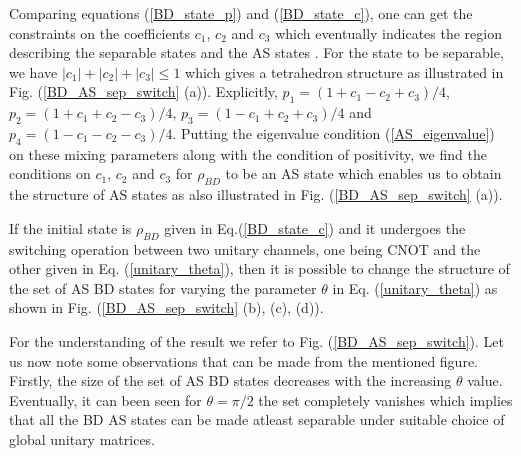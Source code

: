 \noindent Comparing equations (\ref{BD_state_p}) and (\ref{BD_state_c}), one can get the constraints on the coefficients $c_1$, $c_2$ and $c_3$ which eventually indicates the region describing the separable states and the AS states \cite{LC_10}. For the state to be separable, we have $|c_1|+|c_2|+|c_3| \leq 1$ which gives a tetrahedron structure as illustrated in Fig. (\ref{BD_AS_sep_switch} (a)). Explicitly, $p_1=(1+c_1-c_2+c_3)/4$, $p_2=(1+c_1+c_2-c_3)/4$, $p_3=(1-c_1+c_2+c_3)/4$ and $p_4=(1-c_1-c_2-c_3)/4$. Putting the eigenvalue condition (\ref{AS_eigenvalue}) on these mixing parameters along with the condition of positivity, we find the conditions on $c_1$, $c_2$ and $c_3$ for $\rho_{BD}$ to be an AS state which enables us to obtain the structure of AS states as also illustrated in Fig. (\ref{BD_AS_sep_switch} (a)). 
\begin{result}
    If the initial state is $\rho_{BD}$ given in Eq.(\ref{BD_state_c}) and it undergoes the switching operation between two unitary channels, one being CNOT and the other given in Eq. (\ref{unitary_theta}), then it is possible to change the structure of the set of AS BD states for varying the parameter $\theta$ in Eq. (\ref{unitary_theta}) as shown in Fig. (\ref{BD_AS_sep_switch} (b), (c), (d)). 
\end{result}
For the understanding of the result we refer to Fig. (\ref{BD_AS_sep_switch}). Let us now note some observations that can be made from the mentioned figure. Firstly, the size of the set of AS BD states decreases with the increasing $\theta$ value. Eventually, it can been seen for $\theta=\pi/2$ the set completely vanishes which implies that all the BD AS states can be made atleast separable under suitable choice of global unitary matrices.

